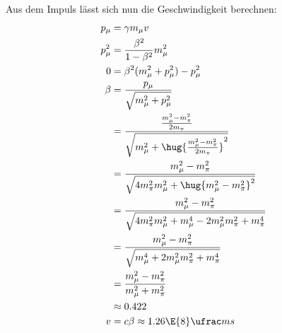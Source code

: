 \documentclass[exb]{exercise_5.0}
\begin{document}
Aus dem Impuls lässt sich nun die Geschwindigkeit berechnen:
\begin{align*}
    p_\mu &= \gamma m_\mu v\\
    p_\mu^2 &= \frac{\beta^2}{1-\beta^2} m_\mu^2\\
    0 &= \beta^2( m_\mu^2 + p_\mu^2) - p_\mu^2\\
    \beta &= \frac{p_\mu}{\sqrt{m_\mu^2 + p_\mu^2}}\\
     &= \frac{\frac{m_\mu^2 - m_\pi^2}{2m_\pi }}{\sqrt{m_\mu^2 + \hug{\frac{m_\mu^2 - m_\pi^2}{2m_\pi }}^2}}\\
    &= \frac{m_\mu^2 - m_\pi^2}{\sqrt{4m_\pi^2 m_\mu^2 + \hug{m_\mu^2 - m_\pi^2}^2}}\\
    &= \frac{m_\mu^2 - m_\pi^2}{\sqrt{4m_\pi^2 m_\mu^2 + m_\mu^4 - 2m_\mu^2 m_\pi^2 + m_\pi^4}}\\
    &= \frac{m_\mu^2 - m_\pi^2}{\sqrt{m_\mu^4 + 2 m_\mu^2 m_\pi^2 + m_\pi^4}}\\
    &= \frac{m_\mu^2 - m_\pi^2}{m_\mu^2 + m_\pi^2}\\
    &\approx 0.422\\
    v &= c\beta \approx 1.26\E{8}\ufrac ms 
\end{align*}
\end{document}
